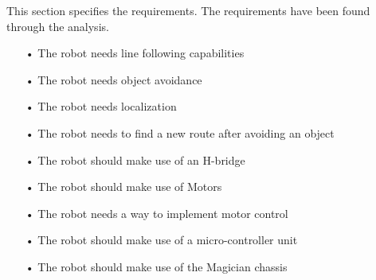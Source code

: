 This section specifies the requirements. The requirements have been found through the analysis.
\begin{enumerate}
	\item[•]The robot needs line following capabilities
	\item[•]The robot needs object avoidance
	\item[•]The robot needs localization
	\item[•]The robot needs to find a new route after avoiding an object
	\item[•]The robot should make use of an H-bridge
	\item[•]The robot should make use of Motors
	\item[•]The robot needs a way to implement motor control
	\item[•]The robot should make use of a micro-controller unit
	\item[•]The robot should make use of the Magician chassis
\end{enumerate}

%